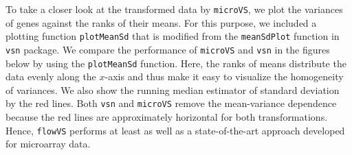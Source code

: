 \documentclass{article}\usepackage[]{graphicx}\usepackage[]{color}
\begin{document}
To take a closer look at the transformed data by \texttt{microVS}, we plot the variances of genes against the ranks of their means.
For this purpose, we included a plotting function \texttt{plotMeanSd} that is modified from the \texttt{meanSdPlot} function in \texttt{vsn} package.
We compare the performance of \texttt{microVS} and \texttt{vsn} in the figures below by using the  \texttt{plotMeanSd} function.
Here, the ranks of means distribute the data evenly along the $x$-axis and thus make it easy to visualize the homogeneity of variances.
We also show the running median estimator of standard deviation by the red lines. 
Both \texttt{vsn} and \texttt{microVS} remove the mean-variance dependence because the red lines are approximately horizontal for both transformations. 
Hence, \texttt{flowVS} performs at least as well as a state-of-the-art approach developed for microarray data.
\end{document}
